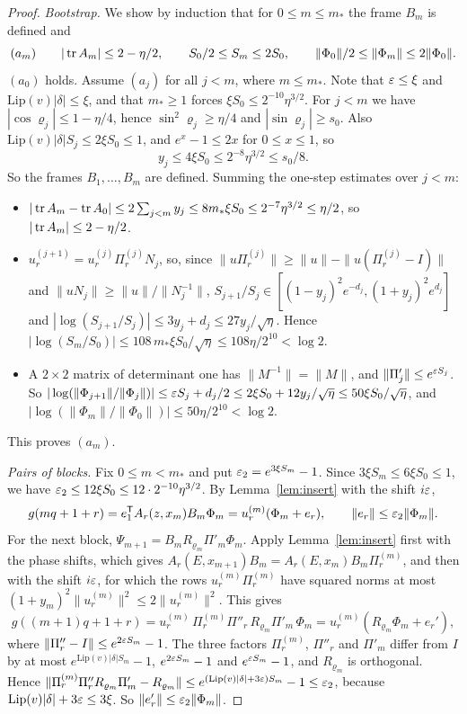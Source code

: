 \begin{proof}
\emph{Bootstrap.} We show by induction that for $0\le m\le m_*$ the frame $B_m$ is defined and
\[
(a_m)\qquad|\operatorname{tr} A_m|\le2-\eta/2,\qquad S_0/2\le S_m\le2S_0,\qquad\|\Phi_0\|/2\le\|\Phi_m\|\le2\|\Phi_0\|.
\]
$(a_0)$ holds. Assume $(a_j)$ for all $j<m$, where $m\le m_*$. Note that $\varepsilon\le\xi$ and $\mathrm{Lip}(v)|\delta|\le\xi$, and that $m_*\ge1$ forces $\xi S_0\le2^{-10}\eta^{3/2}$. For $j<m$ we have $|\cos\varrho_j|\le1-\eta/4$, hence $\sin^2\varrho_j\ge\eta/4$ and $|\sin\varrho_j|\ge s_0$. Also $\mathrm{Lip}(v)|\delta|S_j\le2\xi S_0\le1$, and $e^x-1\le2x$ for $0\le x\le1$, so
\[
y_j\le4\xi S_0\le2^{-8}\eta^{3/2}\le s_0/8 .
\]
So the frames $B_1,\dots,B_m$ are defined. Summing the one-step estimates over $j<m$:
\begin{itemize}
\item $|\operatorname{tr} A_m-\operatorname{tr} A_0|\le2\sum_{j<m}y_j\le8m_*\xi S_0\le2^{-7}\eta^{3/2}\le\eta/2$, so $|\operatorname{tr} A_m|\le2-\eta/2$.
\item $u_r^{(j+1)}=u_r^{(j)}\Pi^{(j)}_rN_j$, so, since $\|u\Pi^{(j)}_r\|\ge\|u\|-\|u(\Pi^{(j)}_r-I)\|$ and $\|uN_j\|\ge\|u\|/\|N_j^{-1}\|$, $S_{j+1}/S_j\in[(1-y_j)^2e^{-d_j},(1+y_j)^2e^{d_j}]$ and $|\log(S_{j+1}/S_j)|\le3y_j+d_j\le27y_j/\sqrt\eta$. Hence $|\log(S_m/S_0)|\le108\,m_*\xi S_0/\sqrt\eta\le108\eta/2^{10}<\log2$.
\item A $2\times2$ matrix of determinant one has $\|M^{-1}\|=\|M\|$, and $\|\Pi'_j\|\le e^{\varepsilon S_j}$. So $|\log(\|\Phi_{j+1}\|/\|\Phi_j\|)|\le\varepsilon S_j+d_j/2\le2\xi S_0+12y_j/\sqrt\eta\le50\xi S_0/\sqrt\eta$, and $|\log(\|\Phi_m\|/\|\Phi_0\|)|\le50\eta/2^{10}<\log2$.
\end{itemize}
This proves $(a_m)$.

\emph{Pairs of blocks.} Fix $0\le m<m_*$ and put $\varepsilon_2=e^{3\xi S_m}-1$. Since $3\xi S_m\le6\xi S_0\le1$, we have $\varepsilon_2\le12\xi S_0\le12\cdot2^{-10}\eta^{3/2}$. By Lemma~\ref{lem:insert} with the shift $i\varepsilon$,
\[
g(mq+1+r)=e_1^{\mathsf T}A_r(z,x_m)B_m\Phi_m=u_r^{(m)}(\Phi_m+e_r),\qquad\|e_r\|\le\varepsilon_2\|\Phi_m\| .
\]
For the next block, $\Psi_{m+1}=B_mR_{\varrho_m}\Pi'_m\Phi_m$. Apply Lemma~\ref{lem:insert} first with the phase shifts, which gives $A_r(E,x_{m+1})B_m=A_r(E,x_m)B_m\Pi^{(m)}_r$, and then with the shift $i\varepsilon$, for which the rows $u_r^{(m)}\Pi^{(m)}_r$ have squared norms at most $(1+y_m)^2\|u_r^{(m)}\|^2\le2\|u_r^{(m)}\|^2$. This gives
\[
g((m+1)q+1+r)=u_r^{(m)}\,\Pi^{(m)}_r\Pi''_r\,R_{\varrho_m}\Pi'_m\,\Phi_m=u_r^{(m)}(R_{\varrho_m}\Phi_m+e_r'),
\]
where $\|\Pi''_r-I\|\le e^{2\varepsilon S_m}-1$. The three factors $\Pi^{(m)}_r$, $\Pi''_r$ and $\Pi'_m$ differ from $I$ by at most $e^{\mathrm{Lip}(v)|\delta|S_m}-1$, $e^{2\varepsilon S_m}-1$ and $e^{\varepsilon S_m}-1$, and $R_{\varrho_m}$ is orthogonal. Hence $\|\Pi^{(m)}_r\Pi''_rR_{\varrho_m}\Pi'_m-R_{\varrho_m}\|\le e^{(\mathrm{Lip}(v)|\delta|+3\varepsilon)S_m}-1\le\varepsilon_2$, because $\mathrm{Lip}(v)|\delta|+3\varepsilon\le3\xi$. So $\|e_r'\|\le\varepsilon_2\|\Phi_m\|$.


\end{proof}
